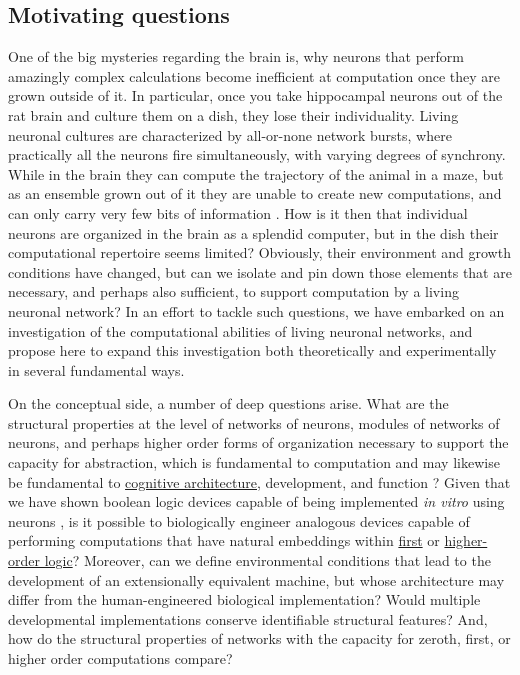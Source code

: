 \subsection{Motivating questions}
\label{sec:questions}
One of the big mysteries regarding the brain is, why neurons that perform amazingly complex calculations become inefficient at computation once they are grown outside of it. In particular, once you take hippocampal neurons out of the rat brain and culture them on a dish, they lose their individuality. Living neuronal cultures are characterized by all-or-none network bursts, where practically all the neurons fire simultaneously, with varying degrees of synchrony. While in the brain they can compute the trajectory of the animal in a maze, but as an ensemble grown out of it they are unable to create new computations, and can only carry very few bits of information \cite{Feinerman2006}. How is it then that individual neurons are organized in the brain as a splendid computer, but in the dish their computational repertoire seems limited? Obviously, their environment and growth conditions have changed, but can we isolate and pin down those elements that are necessary, and perhaps also sufficient, to support computation by a living neuronal network? In an effort to tackle such questions, we have embarked on an investigation of the computational abilities of living neuronal networks, and propose here to expand this investigation both theoretically and experimentally in several fundamental ways.

On the conceptual side, a number of deep questions arise. What are the structural properties at the level of networks of neurons,
modules of networks of neurons, and perhaps higher order forms of
organization necessary to support the capacity for
abstraction, which is fundamental to computation \cite{Abelson1996} and may likewise be fundamental to
\href{http://en.wikipedia.org/wiki/Cognitive\_architecture}{cognitive
architecture}, development, and function \cite{Tenenbaum2011}? Given that we have shown boolean
logic devices capable of being implemented {\em in vitro} using
neurons \cite{Feinerman2008}, is it possible to biologically engineer analogous
devices capable of performing computations that have natural embeddings
within \href{http://en.wikipedia.org/wiki/First-order\_logic}{first} or
\href{http://en.wikipedia.org/wiki/Higher\_order\_logic}{higher-order
logic}? Moreover, can we define environmental conditions that lead to
the development of an extensionally equivalent machine, but whose
architecture may differ from the human-engineered biological
implementation? Would multiple developmental implementations conserve
identifiable structural features? And, how do the structural properties
of networks with the capacity for zeroth, first, or higher order
computations compare?

